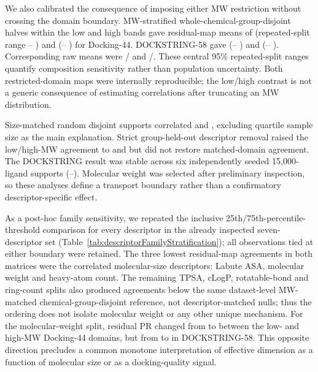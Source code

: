 \documentclass[11pt]{article}
\begin{document}
We also calibrated the consequence of imposing either MW restriction without crossing the
domain boundary. MW-stratified whole-chemical-group-disjoint halves within the low and high
bands gave residual-map means of \DffMWWithinLowResidualGroupDisjointMean{}
(repeated-split range \DffMWWithinLowResidualGroupDisjointLow{}--
\DffMWWithinLowResidualGroupDisjointHigh{}) and
\DffMWWithinHighResidualGroupDisjointMean{}
(\DffMWWithinHighResidualGroupDisjointLow{}--
\DffMWWithinHighResidualGroupDisjointHigh{}) for Docking-44. DOCKSTRING-58 gave
\DsMWWithinLowResidualGroupDisjointMean{}
(\DsMWWithinLowResidualGroupDisjointLow{}--
\DsMWWithinLowResidualGroupDisjointHigh{}) and
\DsMWWithinHighResidualGroupDisjointMean{}
(\DsMWWithinHighResidualGroupDisjointLow{}--
\DsMWWithinHighResidualGroupDisjointHigh{}). Corresponding raw means were
\DffMWWithinLowRawGroupDisjointMean{}/\DffMWWithinHighRawGroupDisjointMean{} and
\DsMWWithinLowRawGroupDisjointMean{}/\DsMWWithinHighRawGroupDisjointMean{}.
These central 95\% repeated-split ranges quantify composition sensitivity rather than
population uncertainty. Both restricted-domain maps were internally reproducible; the
low/high contrast is not a generic consequence of estimating correlations after truncating
an MW distribution.

Size-matched random disjoint supports correlated \DffMWDomainRandomControl{} and
\DsMWDomainRandomControl{}, excluding quartile sample size as the main explanation.
Strict group-held-out descriptor removal raised the low/high-MW agreement to
\DffMWDomainAdjusted{} and \DsMWDomainAdjusted{} but did not restore matched-domain
agreement. The DOCKSTRING result was stable across six independently seeded 15,000-ligand
supports (\DsMWDomainSeedLow{}--\DsMWDomainSeedHigh{}). Molecular weight was selected after preliminary inspection, so
these analyses define a transport boundary rather than a confirmatory descriptor-specific
effect.

As a post-hoc family sensitivity, we repeated the inclusive 25th/75th-percentile-threshold
comparison for every descriptor in the already inspected seven-descriptor set
(Table~\ref{tab:descriptorFamilyStratification}); all observations tied at either boundary
were retained. The three lowest residual-map agreements
in both matrices were the correlated molecular-size descriptors: Labute ASA, molecular
weight and heavy-atom count. The remaining TPSA, cLogP, rotatable-bond and ring-count splits
also produced agreements below the same dataset-level MW-matched chemical-group-disjoint
reference, not descriptor-matched nulls; thus the ordering does not isolate molecular weight
or any other unique mechanism.
For the molecular-weight split, residual PR changed from \DffMWLowDomainResidualPR{} to
\DffMWHighDomainResidualPR{} between the low- and high-MW Docking-44 domains, but from
\DsMWLowDomainResidualPR{} to \DsMWHighDomainResidualPR{} in DOCKSTRING-58. This opposite direction
precludes a common monotone interpretation of effective dimension as a function of
molecular size or as a docking-quality signal.
\end{document}
